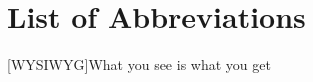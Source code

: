 \chapter*{List of Abbreviations}
\begin{acronym}[AAAAAAA]
    [WYSIWYG]{What you see is what you get}
\end{acronym}
